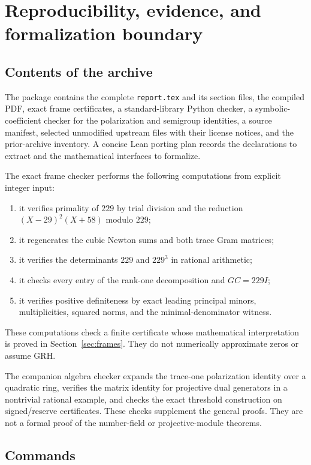 \section{Reproducibility, evidence, and formalization boundary}

\subsection{Contents of the archive}

The package contains the complete \texttt{report.tex} and its section files, the compiled PDF, exact frame certificates, a standard-library Python checker, a symbolic-coefficient checker for the polarization and semigroup identities, a source manifest, selected unmodified upstream files with their license notices, and the prior-archive inventory. A concise Lean porting plan records the declarations to extract and the mathematical interfaces to formalize.

The exact frame checker performs the following computations from explicit integer input:
\begin{enumerate}
\item it verifies primality of $229$ by trial division and the reduction $(X-29)^2(X+58)$ modulo $229$;
\item it regenerates the cubic Newton sums and both trace Gram matrices;
\item it verifies the determinants $229$ and $229^3$ in rational arithmetic;
\item it checks every entry of the rank-one decomposition and $GC=229I$;
\item it verifies positive definiteness by exact leading principal minors, multiplicities, squared norms, and the minimal-denominator witness.
\end{enumerate}
These computations check a finite certificate whose mathematical interpretation is proved in Section~\ref{sec:frames}. They do not numerically approximate zeros or assume GRH.

The companion algebra checker expands the trace-one polarization identity over a quadratic ring, verifies the matrix identity for projective dual generators in a nontrivial rational example, and checks the exact threshold construction on signed/reserve certificates. These checks supplement the general proofs. They are not a formal proof of the number-field or projective-module theorems.

\subsection{Commands}

